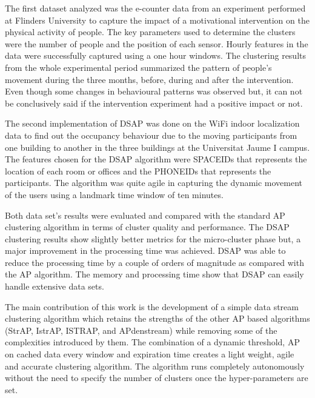 The first dataset analyzed was the e-counter data from an experiment performed at Flinders University to capture the impact of a motivational intervention on the physical activity of people. The key parameters used to determine the clusters were the number of people and the position of each sensor. Hourly features in the data were successfully captured using a one hour windows. The clustering results from the whole experimental period summarized the pattern of people's movement during the three months, before, during and after the intervention. Even though some changes in behavioural patterns was observed but, it can not be conclusively said if the intervention experiment had a positive impact or not.


The second implementation of DSAP was done on the WiFi indoor localization data to find out the occupancy behaviour due to the moving participants from one building to another in the three buildings at the Universitat Jaume I campus. The features chosen for the DSAP algorithm were SPACEIDs that represents the location of each room or offices and the PHONEIDs that represents the participants. The algorithm was quite agile in capturing the dynamic movement of the users using a landmark time window of ten minutes. 
 
 
Both data set's results were evaluated and compared with the standard AP clustering algorithm in terms of cluster quality and performance. The DSAP clustering results show slightly better metrics for the micro-cluster phase but, a major improvement in the processing time was achieved. DSAP was able to reduce the processing time by a couple of orders of magnitude as compared with the AP algorithm. The memory and processing time show that DSAP can easily handle extensive data sets. 

The main contribution of this work is the development of a simple data stream clustering algorithm which retains the strengths of the other AP based algorithms (StrAP, IstrAP, ISTRAP, and APdenstream) while removing some of the complexities introduced by them. The combination of a dynamic threshold, AP on cached data every window and expiration time creates a light weight, agile and accurate clustering algorithm. The algorithm runs completely autonomously without the need to specify the number of clusters once the hyper-parameters are set. 

